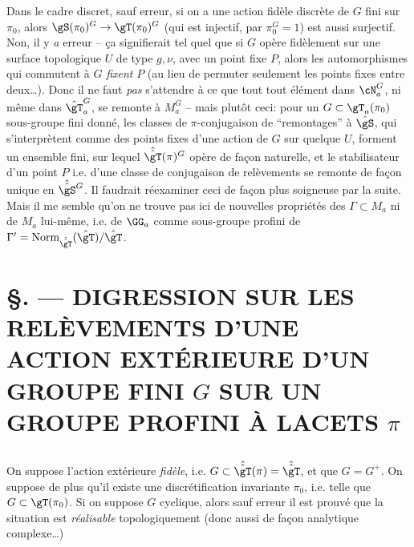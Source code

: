 Dans le cadre discret, sauf erreur, si on a une action fidèle
discrète de $G$ fini sur $\pi_0$, alors $\gS(\pi_0)^G\to\gT(\pi_0)
^G$ (qui est injectif, par $\pi_0^G=1$) est aussi surjectif.  Non,
il y {\it a} erreur -- \c ca signifierait tel quel que si $G$ opère
fidèlement sur une surface topologique $U$ de type $g,\nu$,
avec un point fixe $P$, alors les automorphismes qui commutent à $G$
{\it fixent} $P$ (au lieu de permuter seulement les points fixes
entre deux\dots).  Donc il ne faut {\it pas} s'attendre à ce que tout
tout élément  dans $\cN_a^G$, ni même dans $\hat\gT_a^G$, se remonte à
$M_a^G$ -- mais plutôt ceci: pour un $G\subset \gT_a(\pi_0)$
sous-groupe fini donné, les classes de $\pi$-conjugaison
de ``remontages'' à $\hat\gS$, qui s'interprètent comme des
points fixes d'une action de $G$ sur quelque $U$, forment un
ensemble fini, sur lequel $\hat{\hat\gT}(\pi)^G$ opère
de fa\c con naturelle, et le stabilisateur d'un point $P$ i.e.
d'une classe de conjugaison de relèvements se remonte de fa\c con
unique en $\hat{\hat\gS}^G$.  Il faudrait réexaminer ceci
de fa\c con plus soigneuse par la suite.  Mais il me semble
qu'on ne trouve pas ici de nouvelles propriétés des
$\Gamma\subset M_a$ ni de $M_a$ lui-même, i.e. de $\GG_a$
comme sous-groupe profini de $\Gamma'={\rm Norm}_{\hat{\hat\gT}}
(\hat\gT)/\hat\gT$.














\chapter*{\S {}. --- DIGRESSION SUR LES RELÈVEMENTS D'UNE ACTION EXTÉRIEURE D'UN GROUPE FINI $G$ SUR UN GROUPE PROFINI À LACETS $\pi$}\thispagestyle{empty}
\label{sec:31}
\section*{}

On suppose l'action extérieure {\it fidèle}, i.e. $G\subset \hat{\hat\gT}
(\pi)=\hat{\hat\gT}$, et que $G=G^+$.  On suppose de plus qu'il existe
une discrétification invariante $\pi_0$, i.e. telle que $G\subset 
\gT(\pi_0)$.  Si on suppose $G$ cyclique, alors sauf erreur il est
prouvé que la situation est {\it réalisable} topologiquement (donc aussi
de fa\c con analytique complexe\dots)


